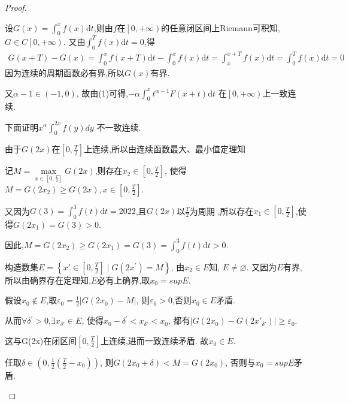 \documentclass[../../main.tex]{subfiles}
\begin{document}
\begin{proof}
\begin{enumerate}[(1)]
设$G(x)=\int_0^x{f\left( x \right)}\mathrm{d}t$,则由$f$在$\left[ 0,+\infty \right)$的任意闭区间上Riemann可积知,
$G\in C\left[ 0,+\infty \right) $.
又由$\int_0^T{f\left( x \right)}\mathrm{d}t=0$,得
\begin{equation}
\begin{split}
G\left( x+T \right) -G\left( x \right) =\int_0^x{f\left( x+T \right)}\mathrm{d}t-\int_0^x{f\left( x \right)}\mathrm{d}t=\int_x^{x+T}{f\left( x \right)}\mathrm{d}t=\int_0^T{f\left( x \right)}\mathrm{d}t=0
\end{split}
\nonumber
\end{equation}
因为连续的周期函数必有界,所以$G(x)$有界.

又$\alpha -1\in \left( -1,0 \right) $,
故由(1)可得,$-\alpha \int_0^x{t^{\alpha -1}F\left( x+t \right)}\mathrm{d}t$
在$\left[ 0,+\infty \right) $上一致连续.

下面证明$x^{\alpha}\int_0^{2x}{f\left( y \right) dy}$
不一致连续.

由于$G(2x)$在$\left[ 0,\frac{T}{2} \right] $上连续,所以由连续函数最大、最小值定理知

记$M=\underset{x\in \left[ 0,\frac{T}{2} \right]}{\max}G\left( 2x \right) $,则存在$x_2\in \left[ 0,\frac{T}{2} \right] $,
使得$M=G\left( 2x_2 \right) \geqslant G\left( 2x \right) ,x\in \left[ 0,\frac{T}{2} \right] $.

又因为$G(3)=\int_0^3{f\left( t \right) \mathrm{d}t}=2022$,且$G(2x)$以$\frac{T}{2}$为周期
,所以存在$x_1\in \left[ 0,\frac{T}{2} \right] $,使得$G(2x_1)=G(3)>0$.

因此,$M=G{\left( 2x_2 \right)}\geqslant G(2x_1)=G\left( 3 \right) =\int_0^3{f\left( t \right) \mathrm{d}t}>0$.

构造数集$E=\left\{ x'\in \left[ 0,\frac{T}{2} \right] \mid G\left( 2x^{\prime} \right) =M \right\} $,
由$x_2\in E$知,
$E\ne \varnothing $.
又因为$E$有界,所以由确界存在定理知,$E$必有上确界,取$x_0=supE$.

假设$x_0\notin E$,取$\varepsilon _0=\frac{1}{2}\left| G\left( 2x_0 \right) -M \right|$,
则$\varepsilon _0>0$,否则$x_0\in E$矛盾.

从而$\forall \delta ^{\prime}>0$,$\exists x_{\delta'}\in E$,
使得$ x_0-\delta ^{\prime}<x_{\delta'}<x_0$,
都有$\left| G\left( 2x_0 \right) -G\left( 2x'_{\delta'} \right) \right|\geqslant \varepsilon _0$.

这与G(2x)在闭区间$\left[ 0,\frac{T}{2} \right]$上连续,进而一致连续矛盾.
故$x_0\in E$.

任取$\delta \in \left( 0,\frac{1}{2}\left( \frac{T}{2}-x_0 \right) \right) $,
则$G\left( 2x_0+\delta \right) <M=G\left( 2x_0 \right) $,
否则与$x_0=supE$矛盾.


\end{enumerate}
\end{proof}
\end{document}
